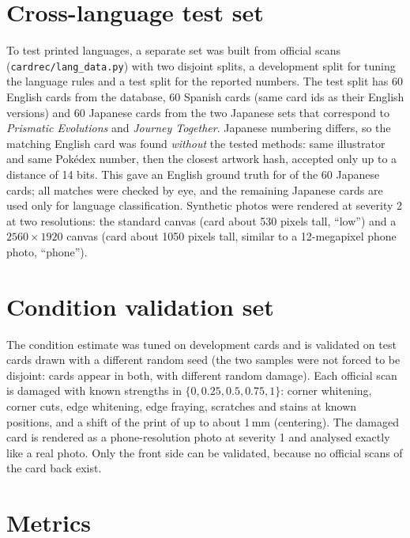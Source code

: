 \section{Cross-language test set}
\label{sec:langdata}

To test printed languages, a separate set was built from official scans (\texttt{cardrec/lang\_data.py}) with two disjoint splits, a development split for tuning the language rules and a test split for the reported numbers. The test split has 60 English cards from the database, 60 Spanish cards (same card ids as their English versions) and 60 Japanese cards from the two Japanese sets that correspond to \emph{Prismatic Evolutions} and \emph{Journey Together}. Japanese numbering differs, so the matching English card was found \emph{without} the tested methods: same illustrator and same Pok\'edex number, then the closest artwork hash, accepted only up to a distance of 14 bits. This gave an English ground truth for  of the 60 Japanese cards; all matches were checked by eye, and the remaining Japanese cards are used only for language classification. Synthetic photos were rendered at severity 2 at two resolutions: the standard canvas (card about 530 pixels tall, ``low'') and a $2560\times1920$ canvas (card about 1050 pixels tall, similar to a 12-megapixel phone photo, ``phone'').

\section{Condition validation set}

The condition estimate was tuned on  development cards and is validated on  test cards drawn with a different random seed (the two samples were not forced to be disjoint:  cards appear in both, with different random damage). Each official scan is damaged with known strengths in $\{0, 0.25, 0.5, 0.75, 1\}$: corner whitening, corner cuts, edge whitening, edge fraying, scratches and stains at known positions, and a shift of the print of up to about 1\,mm (centering). The damaged card is rendered as a phone-resolution photo at severity 1 and analysed exactly like a real photo. Only the front side can be validated, because no official scans of the card back exist.

\section{Metrics}

